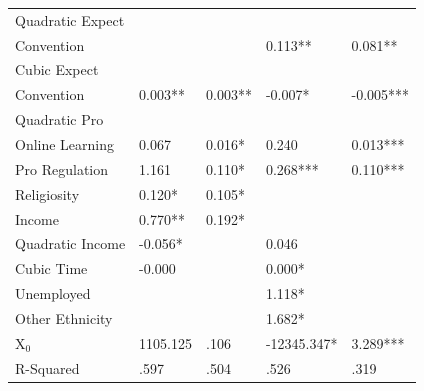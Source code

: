 \documentclass[AER]{./aea-latex-templates/AEA}
\begin{document}
\begin{table}
\begin{tabular}{lllll}
            Quadratic Expect
            \\Convention &  &  & 0.113** & 0.081** \\ %
            Cubic Expect
            \\Convention & 0.003** & 0.003** & -0.007* & -0.005*** \\ %
            Quadratic Pro
            \\Online Learning & 0.067 & 0.016* & 0.240 & 0.013*** \\ %
            Pro Regulation & 1.161 & 0.110* & 0.268*** & 0.110*** \\ %
            Religiosity & 0.120* & 0.105* \\ %
            Income & 0.770** & 0.192* \\ %
            Quadratic Income & -0.056* &  & 0.046 &  \\ %
            Cubic Time & -0.000 &  & 0.000* &  \\ %
            Unemployed &  &  & 1.118* &  \\ %
            Other Ethnicity &  &  & 1.682* & \\ %
            X$_0$ & 1105.125 & .106 & -12345.347* & 3.289*** \\
            R-Squared & .597 & .504 & .526 & .319 %
        

\end{tabular}
\end{table}
\end{document}
